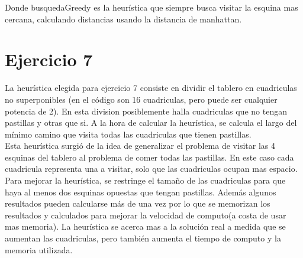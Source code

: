 \documentclass[12pt, titlepage, a4paper]{article}
\begin{document}
Donde busquedaGreedy es la heurística que siempre busca visitar la esquina mas cercana, calculando distancias usando
la distancia de manhattan.


\section{Ejercicio 7}

La heurística elegida para ejercicio 7 consiste en dividir el tablero en cuadriculas no superponibles (en el 
código son 16 cuadriculas, pero puede ser cualquier potencia de 2). En esta division posiblemente halla 
cuadriculas que no tengan pastillas y otras que si. A la hora de calcular la heurística, se calcula el largo 
del mínimo camino que visita todas las cuadriculas que tienen pastillas.\\

Esta heurística surgió de la idea de generalizar el problema de visitar las 4 esquinas del tablero al problema
de comer todas las pastillas. En este caso cada cuadricula representa una  a visitar, solo que las 
cuadriculas ocupan mas espacio.\\

Para mejorar la heurística, se restringe el tamaño de las cuadriculas para que haya al menos dos esquinas 
opuestas que tengan pastillas. Además algunos resultados pueden calcularse más de una vez por lo que se 
memorizan los resultados y calculados para mejorar la velocidad de computo(a costa de usar mas memoria). 
La heurística se acerca mas a la solución real a medida que se aumentan las cuadriculas, pero también aumenta
el tiempo de computo y la memoria utilizada.\\
\end{document}

